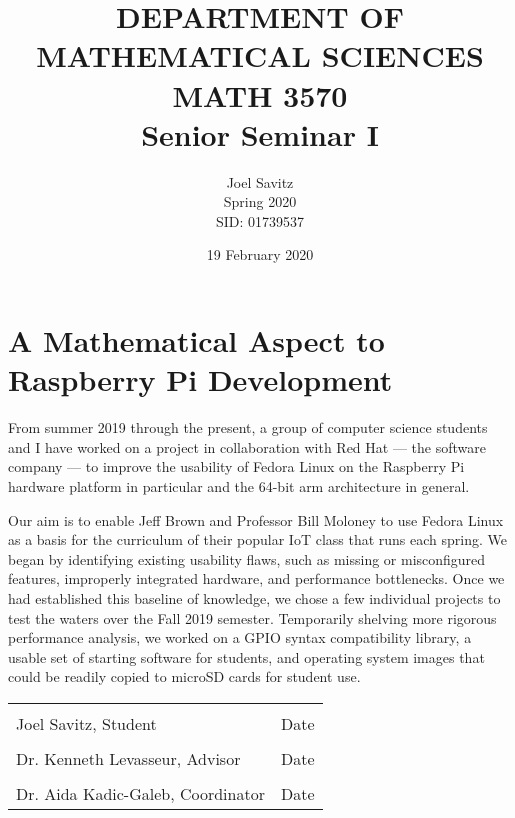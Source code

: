 \documentclass[12pt]{amsart}
\date{19 February 2020}
\title{DEPARTMENT OF MATHEMATICAL SCIENCES \protect\\
MATH 3570 \protect\\
Senior Seminar I}
\author{Joel Savitz \\ Spring 2020 \\ SID: 01739537}
\begin{document}
\maketitle

\section*{A Mathematical Aspect to Raspberry Pi Development}

From summer 2019 through the present, a group of computer science students and I have worked on a project in collaboration with Red Hat --- the software company --- to improve the usability of Fedora Linux on the Raspberry Pi hardware platform in particular and the 64-bit arm architecture in general.

Our aim is to enable Jeff Brown and Professor Bill Moloney to use Fedora Linux as a basis for the curriculum of their popular IoT class that runs each spring.
We began by identifying existing usability flaws, such as missing or misconfigured features, improperly integrated hardware, and performance bottlenecks. Once we had established this baseline of knowledge, we chose a few individual projects to test the waters over the Fall 2019 semester. Temporarily shelving more rigorous performance analysis, we worked on a GPIO syntax compatibility library, a usable set of starting software for students, and operating system images that could be readily copied to microSD cards for student use.



\pagebreak
\noindent\begin{tabular}{ll}
	\makebox[4in]{\hrulefill} & \makebox[1.5in]{\hrulefill} \\
	Joel Savitz, Student & Date \\[8ex]
	\makebox[4in]{\hrulefill} & \makebox[1.5in]{\hrulefill} \\
	Dr. Kenneth Levasseur, Advisor & Date \\[8ex]
	\makebox[4in]{\hrulefill} & \makebox[1.5in]{\hrulefill} \\
	Dr. Aida Kadic-Galeb, Coordinator & Date \\[8ex]
\end{tabular}
\end{document}
